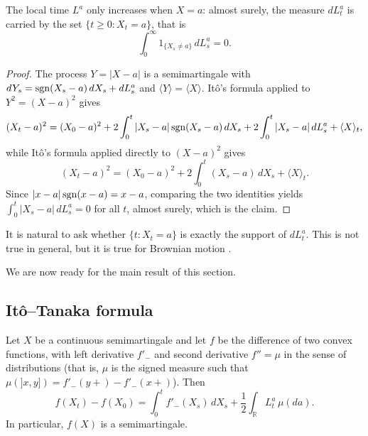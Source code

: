 \begin{theorem}\label{th3}
	The local time $L^a$ only increases when $X = a$: almost surely, the
	measure $dL^a_t$ is carried by the set $\{ t\geqslant 0 : X_t = a\}$, that is
	\[
		\int_0^\infty 1_{\{X_s \neq a\}}\, dL^a_s = 0 .
	\]
\end{theorem}

\begin{proof}
	The process $Y = |X-a|$ is a semimartingale with
	$dY_s = \operatorname{sgn}(X_s - a)\,dX_s + dL^a_s$ and $\langle Y\rangle = \langle X\rangle$.
	It\^o's formula applied to $Y^2 = (X-a)^2$ gives
	\[
		(X_t - a)^{2} =(X_0 - a)^{2}+ 2 \int_0^t |X_s - a| \operatorname{sgn}(X_s -a)\,dX_s
		+ 2 \int_0^t |X_s - a|\,dL_s^a + \langle X \rangle _t,
	\]
	while It\^o's formula applied directly to $(X-a)^2$ gives
	\[
		(X_t - a)^{2} =(X_0 - a)^{2}+ 2 \int_0^t (X_s - a )\,dX_s+ \langle X \rangle _t .
	\]
	Since $|x-a|\operatorname{sgn}(x-a) = x-a$, comparing the two identities yields
	$\int_0^t |X_s - a|\,dL_s^a=0$ for all $t$, almost surely, which is the claim.
\end{proof}

\begin{remark}
	It is natural to ask whether $\{ t : X_t =a \}$ is exactly the support
	of $dL^a_t$. This is not true in general, but it is true for Brownian
	motion \citep[Chapter~VI]{RevuzYor1999}.
\end{remark}

We are now ready for the main result of this section.

\subsection{It\^o--Tanaka formula}

\begin{theorem}\label{th4}
	Let $X$ be a continuous semimartingale and let $f$ be the difference of
	two convex functions, with left derivative $f'_-$ and second derivative
	$f''=\mu$ in the sense of distributions (that is, $\mu$ is the signed
	measure such that $\mu(]x,y]) = f'_-(y+) - f'_-(x+)$). Then
	\[
		f(X_t)-f(X_0)=\int_0^t f'_-(X_s)\,dX_s + \frac{1}{2}\int_\mathbb{R} L_t^a \,\mu(da) .
	\]
	In particular, $f(X)$ is a semimartingale.
\end{theorem}

